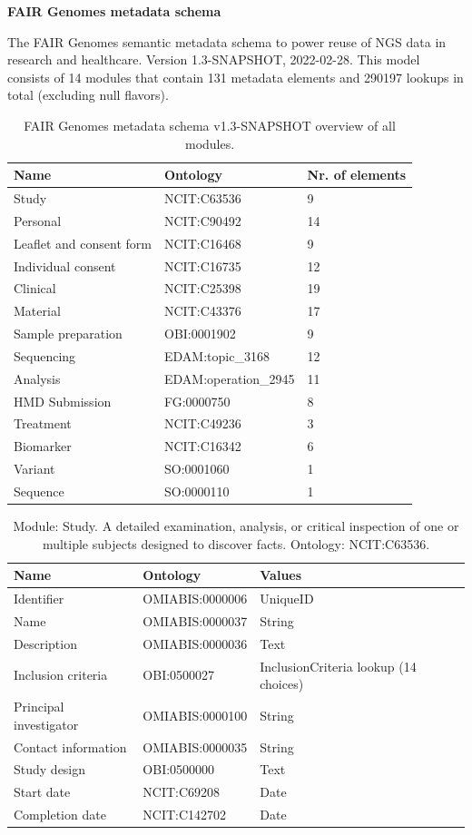 \documentclass{article}
\begin{document}
\setlength\parindent{0pt}

\textbf{FAIR Genomes metadata schema}
\newline

The FAIR Genomes semantic metadata schema to power reuse of NGS data in research and healthcare. Version 1.3-SNAPSHOT, 2022-02-28. This model consists of 14 modules that contain 131 metadata elements and 290197 lookups in total (excluding null flavors).

\begin{table}[htb]
\begin{tabular}{lll}
Name & Ontology & Nr. of elements \\
\hline
Study & NCIT:C63536 & 9 \\
Personal & NCIT:C90492 & 14 \\
Leaflet and consent form & NCIT:C16468 & 9 \\
Individual consent & NCIT:C16735 & 12 \\
Clinical & NCIT:C25398 & 19 \\
Material & NCIT:C43376 & 17 \\
Sample preparation & OBI:0001902 & 9 \\
Sequencing & EDAM:topic\_3168 & 12 \\
Analysis & EDAM:operation\_2945 & 11 \\
HMD Submission & FG:0000750 & 8 \\
Treatment & NCIT:C49236 & 3 \\
Biomarker & NCIT:C16342 & 6 \\
Variant & SO:0001060 & 1 \\
Sequence & SO:0000110 & 1 \\
\hline
\end{tabular}
\caption[Module overview]{\label{table:table1} FAIR Genomes metadata schema v1.3-SNAPSHOT overview of all modules.}
\end{table}

\begin{table}[htb]
\begin{tabular}{lll}
Name & Ontology & Values \\
\hline
Identifier & OMIABIS:0000006 & UniqueID \\
Name & OMIABIS:0000037 & String \\
Description & OMIABIS:0000036 & Text \\
Inclusion criteria & OBI:0500027 & InclusionCriteria lookup (14 choices) \\
Principal investigator & OMIABIS:0000100 & String \\
Contact information & OMIABIS:0000035 & String \\
Study design & OBI:0500000 & Text \\
Start date & NCIT:C69208 & Date \\
Completion date & NCIT:C142702 & Date \\
\hline
\end{tabular}
\caption[Module: Study]{\label{table:table2} Module: Study. A detailed examination, analysis, or critical inspection of one or multiple subjects designed to discover facts. Ontology: NCIT:C63536. }
\end{table}
\end{document}
